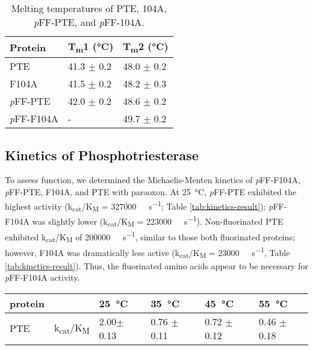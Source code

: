 \begin{refsection}
\begin{table}[htbp]
\centering
\begin{tabular}{ lll }
  \hline
  Protein & T\textsubscript{m}1 (\si{\celsius}) & T\textsubscript{m}2 (\si{\celsius}) \\
  \hline
  PTE & 41.3 $\pm$ 0.2 & 48.0 $\pm$ 0.2 \\
  F104A & 41.5 $\pm$ 0.2 & 48.2 $\pm$ 0.3 \\
  \emph{p}FF-PTE & 42.0 $\pm$ 0.2 & 48.6 $\pm$ 0.2  \\
  \emph{p}FF-F104A & - & 49.7 $\pm$ 0.2  \\
  \hline
\end{tabular}
\caption[Melting temperatures of PTE, 104A, \emph{p}FF-PTE, and
\emph{p}FF-104A]{Melting temperatures of PTE, 104A, \emph{p}FF-PTE, and
\emph{p}FF-104A.} 
    \label{tab:DSC} 
\end{table}

\subsection{Kinetics of Phosphotriesterase}

To assess function, we determined the Michaelis-Menten kinetics of
\emph{p}FF-F104A, \emph{p}FF-PTE, F104A, and PTE with paraoxon. At
\SI{25}{\celsius}, \emph{p}FF-PTE exhibited the highest activity
(k\textsubscript{cat}/K\textsubscript{M} = \SI{327000}{\per\Molar\per\second};
Table \ref{tab:kinetics-result}); \emph{p}FF-F104A was slightly lower
(k\textsubscript{cat}/K\textsubscript{M} = \SI{223000}{\per\Molar\per\second}).
Non-fluorinated PTE exhibited k\textsubscript{cat}/K\textsubscript{M} of
\SI{200000}{\per\Molar\per\second}, similar to those both fluorinated proteins;
however, F104A was dramatically less active
(k\textsubscript{cat}/K\textsubscript{M} = \SI{23000}{\per\Molar\per\second},
Table \ref{tab:kinetics-result}).  Thus, the fluorinated amino acids appear to
be necessary for \emph{p}FF-F104A activity. 
\begin{table}[htbp]
\centering
    \begin{tabular}{llllll}
    \hline
    protein                 &  & \SI{25}{\celsius} & \SI{35}{\celsius} &
    \SI{45}{\celsius} & \SI{55}{\celsius} \\ 
    \hline
    \multirow{2}{*}{PTE}    & k\textsubscript{cat}/K\textsubscript{M} & 2.00$
    \pm$ 0.13 & 0.76 $\pm$ 0.11 & 0.72 $\pm$ 0.12 & 0.46 $\pm$ 0.18 \\
    

\end{tabular}
\end{table}
\end{refsection}
